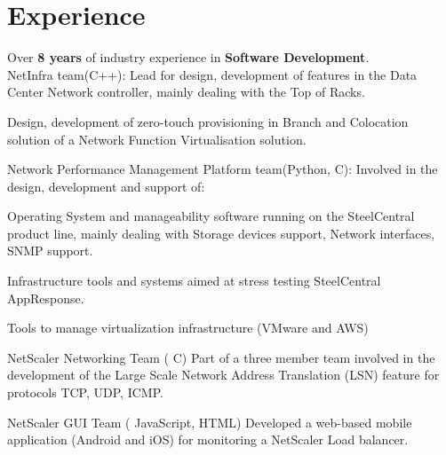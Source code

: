 \documentclass[]{deedy-resume-openfont}
\begin{document}
\hfill
\begin{minipage}[t]{0.63\textwidth} 


\section{Experience}
Over \textbf{8 years} of industry experience in \textbf{Software Development}.         \\
NetInfra team(C++):
Lead for design, development of features in the Data Center Network controller, mainly dealing with the Top of Racks.
\sectionsep

Design, development of zero-touch provisioning in Branch and Colocation solution of a Network Function Virtualisation solution.
\sectionsep

Network Performance Management Platform team(Python, C):
Involved in the design, development and support of:
\vspace{\topsep}
\begin{tightemize}
\item Operating System and manageability software running on the SteelCentral product line,
 mainly dealing with Storage devices support, Network interfaces, SNMP support.
\item Infrastructure tools and systems aimed at stress testing SteelCentral AppResponse. 
\item Tools to manage virtualization infrastructure (VMware and AWS) 
\end{tightemize}
\sectionsep

\begin{tightemize}
\item NetScaler
Networking
Team
(
C)
Part of a three member team
involved
in
the
development
of
the
Large
Scale
Network
Address
Translation
(LSN)
feature
for
protocols
TCP,
UDP,
ICMP.
\item NetScaler
GUI
Team
(
JavaScript,
HTML)
Developed a
web-based
mobile
application (Android
and
iOS)
for
monitoring
a
NetScaler
Load
balancer.
\end{tightemize}
\sectionsep


\end{minipage}
\end{document}

